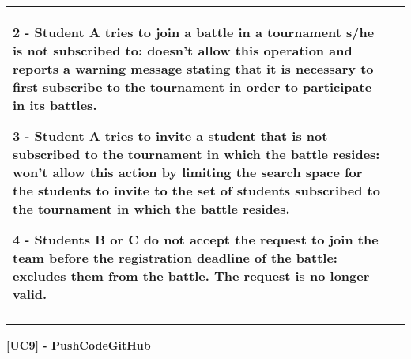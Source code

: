 \begin{longtable}{p{3cm}p{14cm}}
		2 - Student A tries to join a battle in a tournament s/he is not subscribed to: \app doesn't allow this operation and reports a warning message stating that it is necessary to first subscribe to the tournament in order to participate in its battles.
		
		3 - Student A tries to invite a student that is not subscribed to the tournament in which the battle resides: \app won't allow this action by limiting the search space for the students to invite to the set of students subscribed to the tournament in which the battle resides.
		
		4 - Students B or C do not accept the request to join the team before the registration deadline of the battle: \app excludes them from the battle. The request is no longer valid.
		
		\\
		\hline\\

\end{longtable}

	\textbf{[UC9] - PushCodeGitHub }

